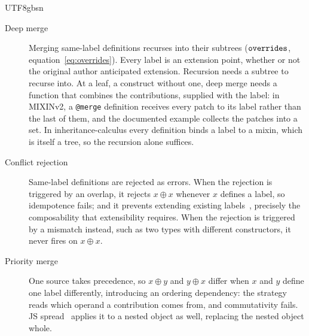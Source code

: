 \begin{CJK*}{UTF8}{gbsn}
\begin{description}
  \item[Deep merge]
    Merging same-label definitions recurses into their subtrees
    ($\mathtt{overrides}$, equation~\ref{eq:overrides}).
    Every label is an extension point, whether or not the
    original author anticipated extension.
    Recursion needs a subtree to recurse into.
    At a leaf, a construct without one, deep merge needs a function
    that combines the contributions, supplied with the label:
    in MIXINv2, a \texttt{@merge} definition receives every
    patch to its label rather than the last of them, and the
    documented example collects the patches into a set.
    In inheritance-calculus every definition binds a label to a
    mixin, which is itself a tree, so the recursion alone suffices.

  \item[Conflict rejection]
    Same-label definitions are rejected as errors.
    When the rejection is triggered by an overlap, it rejects
    $x \oplus x$ whenever $x$ defines a label, so idempotence fails;
    and it prevents extending existing
    labels~\cite{harper1991-symmetric-record-concatenation}, precisely
    the composability that extensibility requires.
    When the rejection is triggered by a mismatch instead, such as two
    types with different constructors, it never fires on
    $x \oplus x$.

  \item[Priority merge]
    One source takes precedence,
    so $x \oplus y$ and $y \oplus x$ differ when $x$ and $y$ define
    one label differently, introducing an ordering dependency:
    the strategy reads which operand a contribution comes from, and
    commutativity fails.
    JS spread~\cite{ecma2018-ecmascript} applies it to a nested
    object as well, replacing the nested object whole.


\end{description}
\end{CJK*}
